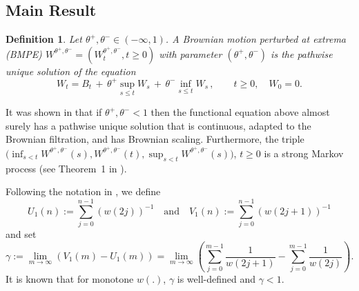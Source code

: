 \documentclass[twoside,12pt, a4paper]{article}
\newtheorem{definition}{Definition}[section]
\numberwithin{equation}{section}
\theoremstyle{remark}
\newcommand{\comment}[1]{\textcolor{blue}{(Comment: #1)}}
\begin{document}
	  
	
	
	
	\subsection{Main Result}
	\begin{definition}
		\label{defn:BMPE}
		Let $\theta^+, \theta^- \in (- \infty , 1)$. A Brownian motion perturbed at
		extrema (BMPE) $W^{\theta^+, \theta^-} = \left(W^{\theta^+, \theta^-}_t, t\geq 0\right)$ with parameter $(\theta^+, \theta^-)$ is the pathwise unique solution of the equation
		$$
		W_t = B_t \,+\, \theta^+ \sup_{s\leq t} W_s  \,+\, \theta^- \inf_{s\leq t} W_s \,,   \qquad t \ge 0, \quad W_0 = 0.
		$$
	\end{definition}
	It was shown in \cite{PW97, CD99} that if $\theta^+, \theta^- < 1$ then the functional equation above almost surely has a pathwise unique solution that is continuous, adapted to the Brownian filtration, and has Brownian scaling. 
	Furthermore, the triple 
	${\big(\inf_{s < t} W^{\theta^{+}, \theta^{-}}(s), 
	W^{\theta^{+}, \theta^{-}}(t) , 
	\sup _{s<t} W^{\theta^{+}, \theta^{-}}(s)\big)}$,
	 $t \geq 0$ is a strong Markov process (see Theorem~1 in \cite{PW97}).
	
	Following the notation in \cite{T96}, we define
	\[
	U_1(n):=\sum_{j=0}^{n-1}(w(2 j))^{-1} \quad \text{and} \quad
	V_1(n):=\sum_{j=0}^{n-1}(w(2 j+1))^{-1}
	\]
	and set
	\begin{equation}
		\label{eq: gamma}
		\gamma:= \lim_{m\to \infty}\left( V_1(m) - U_1(m) \right) =\lim_{m\to \infty} \left( \sum_{j=0}^{m-1} \frac{1}{ w(2j+1)}-  \sum_{j=0}^{m-1}  \frac{1}{w(2j)} \right) 
		.\end{equation}
	It is known that for monotone $w(.)$, $\gamma$
	is well-defined and ${\gamma<1}$. 
\end{document}
